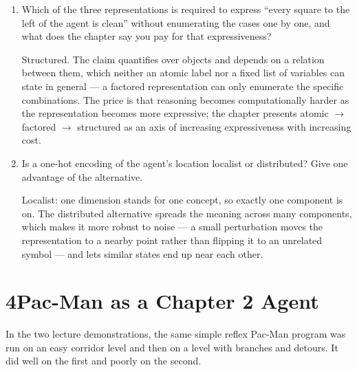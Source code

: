 \documentclass[11pt]{article}
\newif\ifsol
\newcommand{\ans}[1]{\ifsol\relax\else\vspace{#1}\filbreak\fi}
\newenvironment{solution}
  {\ifsol
     \par\vspace{4pt}\noindent
     \color{solgreen}\textbf{Solution.}\enspace\itshape\ignorespaces
   \else
     \setbox0\vbox\bgroup
   \fi}
  {\ifsol\par\normalcolor\upshape\vspace{4pt}\else\egroup\fi}
\newcommand{\qhead}[1]{\section*{#1}}
\begin{document}
\begin{enumerate}[label=(\alph*),leftmargin=*]
\item Which of the three representations is required to express ``every square to the left of
the agent is clean'' without enumerating the cases one by one, and what does the chapter say
you pay for that expressiveness?
\ans{0.85in}
\begin{solution}
Structured. The claim quantifies over objects and depends on a relation between them, which
neither an atomic label nor a fixed list of variables can state in general --- a factored
representation can only enumerate the specific combinations. The price is that reasoning
becomes computationally harder as the representation becomes more expressive; the chapter
presents atomic $\rightarrow$ factored $\rightarrow$ structured as an axis of increasing
expressiveness with increasing cost.
\end{solution}

\item Is a one-hot encoding of the agent's location localist or distributed? Give one
advantage of the alternative.
\ans{0.85in}
\begin{solution}
Localist: one dimension stands for one concept, so exactly one component is on. The
distributed alternative spreads the meaning across many components, which makes it more
robust to noise --- a small perturbation moves the representation to a nearby point rather
than flipping it to an unrelated symbol --- and lets similar states end up near each other.
\end{solution}

\end{enumerate}

\newpage
\qhead{4\quad Pac-Man as a Chapter 2 Agent}

In the two lecture demonstrations, the same simple reflex Pac-Man program was run on an easy
corridor level and then on a level with branches and detours. It did well on the first and
poorly on the second.
\end{document}
